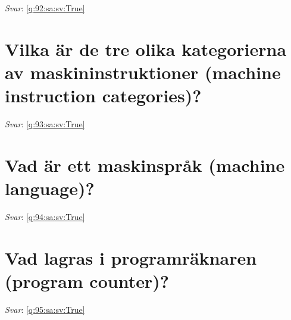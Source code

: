 \documentclass[a4paper,11pt,oneside]{book}
\begin{document}
\begin{sloppypar}
\vspace{2cm}

\noindent\makebox[\textwidth]{\hrulefill}

\vspace{1cm}

\textit{Svar}: \autoref{q:92:sa:sv:True}



\section{Vilka \"ar de tre olika kategorierna av maskininstruktioner (machine instruction categories)?}

\label{q:93:sa:sv:False}

\vspace{2cm}

\noindent\makebox[\textwidth]{\hrulefill}

\vspace{1cm}

\textit{Svar}: \autoref{q:93:sa:sv:True}



\section{Vad \"ar ett maskinspr\r{a}k (machine language)?}

\label{q:94:sa:sv:False}

\vspace{2cm}

\noindent\makebox[\textwidth]{\hrulefill}

\vspace{1cm}

\textit{Svar}: \autoref{q:94:sa:sv:True}



\section{Vad lagras i programr\"aknaren (program counter)?}

\label{q:95:sa:sv:False}

\vspace{2cm}

\noindent\makebox[\textwidth]{\hrulefill}

\vspace{1cm}

\textit{Svar}: \autoref{q:95:sa:sv:True}




\end{sloppypar}
\end{document}

